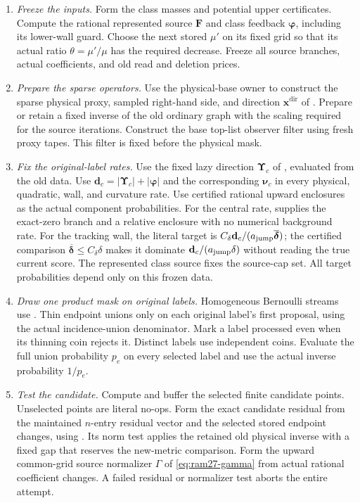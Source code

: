 \documentclass[11pt]{article}
\theoremstyle{remark}
\newcommand{\xxdir}{\mathbf{x}^{\mathrm{dir}}}
\newcommand{\UUps}{\boldsymbol{\Upsilon}}
\newcommand{\FF}{\mathbf F}
\newcommand{\dd}{\mathbf d}
\newcommand{\nnu}{\boldsymbol{\nu}}
\newcommand{\pphi}{\boldsymbol{\varphi}}
\newcommand{\ddeltabar}{\overline{\boldsymbol{\delta}}}
\begin{document}
\begin{enumerate}
\item \emph{Freeze the inputs.}\label{item:ram30-freeze}
Form the class masses and potential upper certificates.
Compute the rational represented source $\FF$ and class feedback
$\pphi$, including its lower-wall guard.  Choose the next stored
$\mu'$ on its fixed grid so that its actual ratio
$\theta=\mu'/\mu$ has the required decrease.  Freeze all source
branches, actual coefficients, and old read and deletion prices.

\item \emph{Prepare the sparse operators.}\label{item:ram30-operators}
Use the physical-base owner to construct the sparse physical proxy, sampled
right-hand side, and direction $\xxdir$ of .
Prepare or retain a fixed inverse of the old ordinary graph with the scaling
required for the source iterations.
Construct the base top-list observer filter using fresh proxy tapes.
This filter is fixed before the physical mask.

\item \emph{Fix the original-label rates.}\label{item:ram30-rates}
Use the fixed lazy direction $\UUps_c$ of , evaluated
from the old data.
Use $\dd_c=|\UUps_c|+|\pphi|$ and the corresponding $\nnu_c$ in every physical,
quadratic, wall, and curvature rate.
Use certified rational upward enclosures as the actual component probabilities.
For the central rate,  supplies the
exact-zero branch and a relative enclosure with no numerical background rate.
For the tracking wall, the literal target is $C_\delta \dd_c/(a_{\rm
jump}\ddeltabar)$; the certified comparison $\ddeltabar\le C_\delta\delta$ makes
it dominate $\dd_c/(a_{\rm jump}\delta)$ without reading the true current score.
The represented class source fixes the source-cap set.
All target probabilities depend only on this frozen data.

\item \emph{Draw one product mask on original labels.}\label{item:ram30-mask}
Homogeneous Bernoulli streams use .
Thin endpoint unions only on each original label's first proposal, using the
actual incidence-union denominator.
Mark a label processed even when its thinning coin rejects it.
Distinct labels use independent coins.
Evaluate the full union probability $p_e$ on every selected label and use the
actual inverse probability $1/p_e$.

\item \emph{Test the candidate.}\label{item:ram30-test}
Compute and buffer the selected finite candidate points.
Unselected points are literal no-ops.
Form the exact candidate residual from the maintained $n$-entry residual vector
and the selected stored endpoint changes, using
.
Its norm test applies the retained old physical inverse with a fixed gap that
reserves the new-metric comparison.
Form the upward common-grid source normalizer $\Gamma$ of \eqref{eq:ram27-gamma}
from actual rational coefficient changes.
A failed residual or normalizer test aborts the entire attempt.


\end{enumerate}
\end{document}
